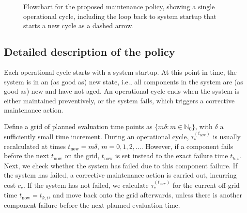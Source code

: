 \documentclass[authoryear]{elsarticle}
\newcommand{\naturals}{\mathbb{N}}
\def\tnow{t_\text{now}}
\newcommand{\tausnow}{\tau_*^{(\tnow)}}
\begin{document}
\begin{figure}
\begin{tikzpicture}
\end{tikzpicture}
\caption{Flowchart for the proposed maintenance policy,
showing a single operational cycle,
including the loop back to system startup that starts a new cycle as a dashed arrow.}
\label{fig:procedure}
\end{figure}

\subsection{Detailed description of the policy}
\label{sec:operationalprocedure}

Each operational cycle starts with a system startup.
At this point in time, the system is in an (as good as) new state,
i.e., all components in the system are (as good as) new and have not aged.
An operational cycle ends when the system is either maintained preventively, %
or the system fails, which triggers a corrective maintenance action.

Define a grid of planned evaluation time points as $\{m \delta : m \in \naturals_0\}$,
with $\delta$ a sufficiently small time increment.
During an operational cycle,
$\tausnow$ is usually recalculated at times $\tnow = m \delta$, $m = 0, 1, 2, \ldots$.
However, if a component fails before the next $\tnow$ on the grid,
$\tnow$ is set instead to the exact failure time $t_{k,i}$.
Next, we check whether the system has failed due to this component failure.
If the system has failed, a corrective maintenance action is carried out, incurring cost $c_c$.
If the system has not failed, we calculate $\tausnow$ for the current off-grid time $\tnow = t_{k,i}$,
and move back onto the grid afterwards,
unless there is another component failure before the next planned evaluation time.
\end{document}
